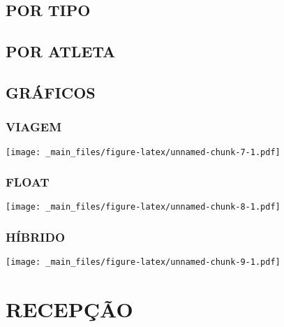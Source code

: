 \documentclass[
]{book}
\begin{document}
\section{POR TIPO}\label{por-tipo}

\begin{table}[!h]
\centering
{}
\end{table}

\section{POR ATLETA}\label{por-atleta}

\section{GRÁFICOS}\label{gruxe1ficos}

\subsection{VIAGEM}\label{viagem}

\texttt{[image: \_main\_files/figure-latex/unnamed-chunk-7-1.pdf]}

\subsection{FLOAT}\label{float}

\texttt{[image: \_main\_files/figure-latex/unnamed-chunk-8-1.pdf]}

\subsection{HÍBRIDO}\label{huxedbrido}

\texttt{[image: \_main\_files/figure-latex/unnamed-chunk-9-1.pdf]}

\chapter{RECEPÇÃO}\label{recepuxe7uxe3o}
\end{document}
